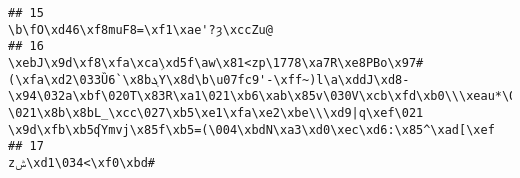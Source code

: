 \documentclass[
]{article}
\begin{document}
\begin{verbatim}
## 15                                                                                                                                                                                                                                                                                                                                                                                                                                                                                                                                                                                                                                                                                                                                                                                                                                                                      \b\fO\xd46\xf8muF8=\xf1\xae'?ȝ\xccZu@
## 16                                                                                                                                                                                                                                                                                                                                                                                                                                                                                                             \xebJ\x9d\xf8\xfa\xcaܼ\xd5f\aw\x81<zp\1778\xa7R\xe8PBo\x97#(\xfa\xd2\033Ȕ6`\x8bܓY\x8d\b\u07fc9'-\xff~)l\a\xddJ\xd8-\x94\032a\xbf\020T\x83R\xa1\021\xb6\xab\x85v\030V\xcb\xfd\xb0\\\xeau*\017\xe0`\x91Q\\\016\xd3\xeb\xfa\001\\a\xd0Evi\xaf\xc7\xd7.\xee\xe3\xe5-ͅ\021\x8b\x8bL_\xcc\027\xb5\xe1\xfa\xe2\xbe\\\xd9|q\xef\021 \x9d\xfb\xb5ʠYmvj\x85f\xb5=(\004\xbdN\xa3\xd0\xec\xd6:\x85^\xad[\xef
## 17                                                                                                                                                                                                                                                                                                                                                                                                                                                                                                                                                                                                                                                                                                                                                                                                                                                                                       zݰ\xd1\034<\xf0\xbd#

\end{verbatim}
\end{document}
